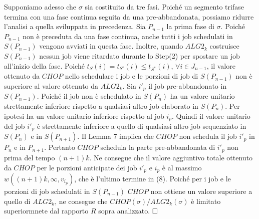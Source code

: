 \documentclass[12pt]{article}
\begin{document}
Supponiamo adesso che $\sigma$ sia costituito da tre fasi. Poiché un segmento trifase termina con una fase continua seguita da una pre-abbandonata, possiamo ridurre l'analisi a quella sviluppata in precedenza. Sia $P_{n - 1}$ la prima fase di $\sigma$. Poiché $P_{n - 1}$ non è preceduta da una fase continua, anche tutti i job schedulati in $S (P_{n - 1})$ vengono avviati in questa fase. Inoltre, quando $ALG2_{k}$ costruisce $S (P_{n - 1})$ nessun job viene ritardato durante lo Step(2) per spostare un job all'inizio della fase. Poiché $t_{S}(i) = t_{S'} (i) \leq t_{S^{*}} (i)$, $\forall i \in J_{n-1}$, il valore ottenuto da $CHOP$ nello schedulare i job e le porzioni di job di $S(P_{n - 1})$ non è superiore al valore ottenuto da $ALG2_{k}$. Sia $i'_{p}$ il job pre-abbandonato in $S (P_{n - 1})$. Poiché il job non è schedulato in $S(P_{n})$ ha un valore unitario strettamente inferiore rispetto a qualsiasi altro job elaborato in $S (P_{n})$. Per ipotesi ha un valore unitario inferiore rispetto al job $i_{p}$. Quindi il valore unitario del job $i'_{p}$ è strettamente inferiore a quello di qualsiasi altro job sequenziato in $S (P_{n})$ e in $S(P_{n + 1})$. Il Lemma 7 implica che $CHOP$ non schedula il job $i'_{p}$ in $P_{n}$ e in $P_{n + 1}$. Pertanto $CHOP$ schedula la parte pre-abbandonata di $i'_{p}$ non prima del tempo $(n + 1) k$. Ne consegue che il valore aggiuntivo totale ottenuto da $CHOP$ per le porzioni anticipate dei job $i'_{p}$ e $i_{p}$ è al massimo $w ((n + 1) k, \infty, v_{i_{p}})$, che è l'ultimo termine in (8). Poiché per i job e le porzioni di job schedulati in $S (P_{n - 1})$ $CHOP$ non ottiene un valore superiore a quello di $ALG2_{k}$, ne consegue che $CHOP (\sigma) / ALG2_{k} (\sigma)$ è limitato superiormnete dal rapporto $R$ sopra analizzato. $\hfill \square$
\end{document}
